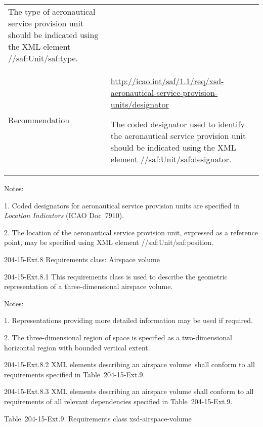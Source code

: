 \begin{longtable}[]{@{}ll@{}}
\begin{minipage}[t]{0.47\columnwidth}
The type of aeronautical service provision unit should be indicated using the XML element //saf:Unit/saf:type.\strut
\end{minipage}\tabularnewline
\begin{minipage}[t]{0.47\columnwidth}\raggedright
Recommendation\strut
\end{minipage} & \begin{minipage}[t]{0.47\columnwidth}\raggedright
\url{http://icao.int/saf/1.1/req/xsd-aeronautical-service-provision-units/designator}

The coded designator used to identify the aeronautical service provision unit should be indicated using the XML element //saf:Unit/saf:designator.\strut
\end{minipage}\tabularnewline
\bottomrule
\end{longtable}

Notes:

1. Coded designators for aeronautical service provision units are specified in \emph{Location Indicators} (ICAO Doc~7910).

2. The location of the aeronautical service provision unit, expressed as a reference point, may be specified using XML element //saf:Unit/saf:position.

204-15-Ext.8 Requirements class: Airspace volume

204-15-Ext.8.1 This requirements class is used to describe the geometric representation of a three-dimensional airspace volume.

Notes:

1. Representations providing more detailed information may be used if required.

2. The three-dimensional region of space is specified as a two-dimensional horizontal region with bounded vertical extent.

204-15-Ext.8.2 XML elements describing an airspace volume~shall conform to all requirements specified in Table~204-15-Ext.9.

204-15-Ext.8.3 XML elements describing an airspace volume shall conform to all requirements of all relevant dependencies specified in Table~204-15-Ext.9.

Table~204-15-Ext.9. Requirements class xsd-airspace-volume

